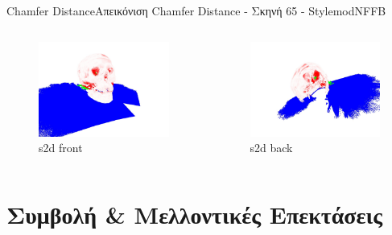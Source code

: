 \documentclass[10pt]{beamer}
\begin{document}
\begin{frame}{Chamfer Distance}{Απεικόνιση Chamfer Distance - Σκηνή 65 - StylemodNFFB}
\begin{columns}[T]
    \begin{figure}
        \centering
        \includegraphics[height=0.3\textheight]{images/s2d_stylemodnffb_64_front.jpg}
        \caption{s2d front}
    \end{figure}
    \begin{figure}
        \centering
        \includegraphics[height=0.3\textheight]{images/s2d_stylemodnffb_65_back.jpg}
        \caption{s2d back}
    \end{figure}
\end{columns}
\end{frame}
\section{Συμβολή \& Μελλοντικές Επεκτάσεις}
\end{document}
